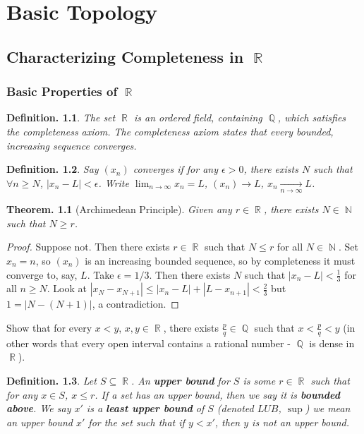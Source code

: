 \documentclass[11pt, a4paper]{memoir}
\DeclareMathOperator{\N}{{\mathbb{N}}}
\DeclareMathOperator{\Q}{{\mathbb{Q}}}
\DeclareMathOperator{\R}{{\mathbb{R}}}
\theoremstyle{change}
\newtheorem{theorem}{Theorem.}[section]
\theoremstyle{plain}
\theoremstyle{nonumberplain}
\newtheorem{definition}{Definition.}
\newtheorem{proof}{Proof}
\numberwithin{equation}{section}
\begin{document}
\chapter{Basic Topology}
\section{Characterizing Completeness in \texorpdfstring{$\R$}{R}}
\subsection{Basic Properties of $\R$}
\begin{definition}
    The set $\R$ is an ordered field, containing $\Q$, which satisfies the completeness axiom. The completeness axiom states
    that every bounded, increasing sequence converges.
\end{definition}
\begin{definition}
    Say $(x_n)$ converges if for any $\epsilon>0$, there exists $N$ such that $\forall n\geq N$, $|x_n-L|<\epsilon$.
    Write $\lim_{n\to\infty}x_n=L$, $(x_n)\to L$, $x_n\underset{n\to\infty}{\to}L$.
\end{definition}
\begin{theorem}[Archimedean Principle]
    Given any $r\in\R$, there exists $N\in\N$ such that $N\geq r$.
\end{theorem}
\begin{proof}
    Suppose not. Then there exists $r\in\R$ such that $N\leq r$ for all $N\in\N$. Set $x_n=n$, so $(x_n)$ is an increasing
    bounded sequence, so by completeness it must converge to, say, $L$. Take $\epsilon=1/3$. Then there exists $N$ such that
    $|x_n-L|<\frac{1}{3}$ for all $n\geq N$. Look at $|x_N-x_{N+1}|\leq|x_n-L|+|L-x_{n+1}|<\frac{2}{3}$ but $1=|N-(N+1)|$,
    a contradiction.
\end{proof}
\begin{exercise}
    Show that for every $x<y$, $x,y\in\R$, there exists $\frac{p}{q}\in\Q$ such that $x<\frac{p}{q}<y$ (in other words that
    every open interval contains a rational number - $\Q$ is dense in $\R$).
\end{exercise}
\begin{definition}
    Let $S\subseteq\R$. An \textbf{upper bound} for $S$ is some $r\in\R$ such that for any $x\in S$, $x\leq r$. If a set has an upper bound,
    then we say it is \textbf{bounded above}. We say $x'$ is a \textbf{least upper bound} of $S$ (denoted $LUB$, $\sup$)
    we mean an upper bound $x'$ for the set such that if $y<x'$, then $y$ is not an upper bound.
\end{definition}
\end{document}
